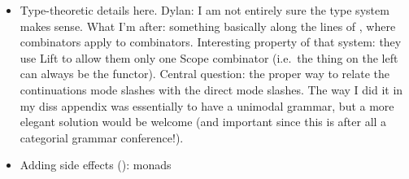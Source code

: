 \begin{itemize}
\begin{figure*}
		\label{fig1}
	\end{figure*}
	\begin{figure*}
		{\small\[\begin{array}{c}
		\begin{array}{cccc}%
			\pruf{%
			\AXC{$\Gamma \vdash f : b/a~~$}
			\AXC{$~~\Delta \vdash e : a$}
			\lab{$/$}
			\BIC{$\Gamma \cdot \Delta \vdash f\,e : b$}
			}
			&
			\pruf{%
			\AXC{$\Delta \vdash e : a~~$}
			\AXC{$~~\Gamma \vdash f : a \backslash b$}
			\lab{$\backslash$}
			\BIC{$\Delta \cdot \Gamma \vdash f\,e : b$}
			}
			&
			\pruf{%
			\AXC{$\Delta \vdash m : \textsf{K}\,(b/a)\,r~~$}
			\AXC{$~~\Gamma \vdash n : \textsf{K}\,a\,r$}
			\lab{$\sslash$}
			\BIC{$\Delta \cdot \Gamma \vdash \bsf{S}_/ m\,n : \textsf{K}\,b\,r$}
			}
			&
			\pruf{%
			\AXC{$\Delta \vdash m : \textsf{K}\,a\,r~~$}
			\AXC{$~~\Gamma \vdash n : \textsf{K}\,(a \backslash b)\,r$}
			\lab{$\bbslash$}
			\BIC{$\Delta \cdot \Gamma \vdash \bsf{S}_\backslash m\,n : \textsf{K}\,b\,r$}%
			}
		\end{array}
		\\\\
		\begin{array}{cc}
			\pruf{%
			\AXC{$\Gamma \vdash e : \textsf{M}\,a$}
			\lab{$\uparrow$}
			\UIC{$\Gamma \vdash \lambda k.\,e \star k : \textsf{K}\,a\,\textsf{M}\,r$}%
			}
			&
			\pruf{%
			\AXC{$\Gamma \vdash m : \textsf{K}\,r\,\textsf{M}\,r$}
			\lab{$\downarrow$}
			\UIC{$\Gamma \vdash m\,\eta : \textsf{M}\,r$}%
			}
		\end{array}
		\\[-1em]
		\end{array}\]}
		\caption{Partial multimodal continuized grammar, with side effects.}
		\label{fig2}
	\end{figure*}
	\item Type-theoretic details here. Dylan: I am not entirely sure the type system makes sense. What I'm after: something basically along the lines of \citealt{ShanBarker:2006}, where combinators apply to combinators. Interesting property of that system: they use Lift to allow them only one Scope combinator (i.e.~the thing on the left can always be the functor). Central question: the proper way to relate the continuations mode slashes with the direct mode slashes. The way I did it in my diss appendix was essentially to have a unimodal grammar, but a more elegant solution would be welcome (and important since this is after all a categorial grammar conference!). %
	
	\item Adding side effects (\citealt{Wadler:1994, Wadler:1995, Shan:2002}): monads%
	

\end{itemize}
